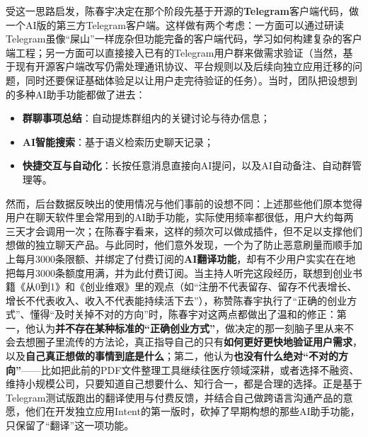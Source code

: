\documentclass[UTF8,a4paper,11pt,fontset=fandol]{ctexart}
\begin{document}
受这一思路启发，陈春宇决定在那个阶段先基于开源的\textbf{Telegram}客户端代码，做一个AI版的第三方Telegram客户端。这样做有两个考虑：一方面可以通过研读Telegram虽像“屎山”一样庞杂但功能完备的客户端代码，学习如何构建复杂的客户端工程；另一方面可以直接接入已有的Telegram用户群来做需求验证（当然，基于现有开源客户端改写仍需处理通讯协议、平台规则以及后续向独立应用迁移的问题，同时还要保证基础体验足以让用户走完待验证的任务）。当时，团队把设想到的多种AI助手功能都做了进去：

\begin{itemize}
\item \textbf{群聊事项总结}：自动提炼群组内的关键讨论与待办信息；
\item \textbf{AI智能搜索}：基于语义检索历史聊天记录；
\item \textbf{快捷交互与自动化}：长按任意消息直接向AI提问，以及AI自动备注、自动群管理等。
\end{itemize}

然而，后台数据反映出的使用情况与他们事前的设想不同：上述那些他们原本觉得用户在聊天软件里会常用到的AI助手功能，实际使用频率都很低，用户大约每两三天才会调用一次；在陈春宇看来，这样的频次可以做成插件，但不足以支撑他们想做的独立聊天产品。与此同时，他们意外发现，一个为了防止恶意刷量而顺手加上每月3000条限额、并绑定了付费订阅的\textbf{AI翻译功能}，却有不少用户实实在在地把每月3000条额度用满，并为此付费订阅。当主持人听完这段经历，联想到创业书籍《从0到1》和《创业维艰》里的观点（如“注册不代表留存、留存不代表增长、增长不代表收入、收入不代表能持续活下去”），称赞陈春宇执行了“正确的创业方式”、懂得“及时关掉不对的方向”时，陈春宇对这两点都做出了温和的修正：第一，他认为\textbf{并不存在某种标准的“正确创业方式”}，做决定的那一刻脑子里从来不会去想圈子里流传的方法论，真正指导自己的只有\textbf{如何更好更快地验证用户需求}，以及\textbf{自己真正想做的事情到底是什么}；第二，他认为\textbf{也没有什么绝对“不对的方向”}——比如把此前的PDF文件整理工具继续往医疗领域深耕，或者选择不融资、维持小规模公司，只要知道自己想要什么、知行合一，都是合理的选择。正是基于Telegram测试版跑出的翻译使用与付费反馈，并结合自己做跨语言沟通产品的意愿，他们在开发独立应用Intent的第一版时，砍掉了早期构想的那些AI助手功能，只保留了“翻译”这一项功能。
\end{document}
